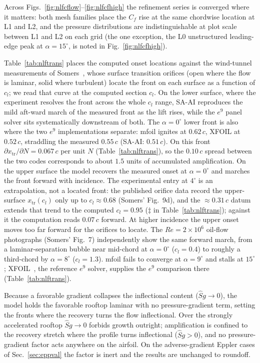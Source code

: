 \documentclass[journal]{new-aiaa}
\begin{document}
Across Figs.~\ref{fig:nlfcflow}--\ref{fig:nlfcfhigh} the refinement series
is converged where it matters: both mesh families place the $C_f$ rise at the
same chordwise location at L1 and L2, and the pressure distributions are
indistinguishable at plot scale between L1 and L2 on each grid (the one
exception, the L0 unstructured leading-edge peak at $\alpha\!=\!15^\circ$, is
noted in Fig.~\ref{fig:nlfcfhigh}).

Table~\ref{tab:nlftrans} places the computed onset locations against the
wind-tunnel
measurements of Somers~\cite{somers_1981}, whose surface transition orifices
(open where the flow is laminar, solid where turbulent) locate the front on each
surface as a function of $c_l$; we read that curve at the computed section
$c_l$. On the lower surface, where the experiment resolves the front across the
whole $c_l$ range, SA-AI reproduces the mild aft-ward march of the measured
front as the lift rises, while the $e^9$ panel solver sits systematically
downstream of both. The $\alpha\!=\!0^\circ$
lower front is also where the two $e^9$ implementations separate:
mfoil ignites at $0.62\,c$, XFOIL at $0.52\,c$, straddling the
measured $0.55\,c$ (SA-AI: $0.51\,c$). On this front
$\partial x_\mathrm{tr}/\partial N\!=\!0.067\,c$ per unit $N$
(Table~\ref{tab:nlftrans}), so the $0.10\,c$ spread between the two
codes corresponds to about $1.5$ units of accumulated amplification. On the upper surface the model
recovers the measured onset at $\alpha\!=\!0^\circ$ and marches
the front forward with incidence. The experimental entry at $4^\circ$ is an
extrapolation, not a located front: the published orifice data record the
upper-surface $x_\mathrm{tr}(c_l)$ only up to $c_l\!\approx\!0.68$ (Somers'
Fig.~9d), and the $\approx\!0.31\,c$ datum extends that trend to the
computed $c_l\!=\!0.95$ ($\ddagger$ in Table~\ref{tab:nlftrans}); against
it the computation reads $0.07\,c$ forward. At higher incidence the upper onset moves too far forward
for the orifices to locate. The $Re\!=\!2\!\times\!10^6$ oil-flow
photographs (Somers' Fig.~7) independently show the same forward march, from a
laminar-separation bubble near mid-chord at $\alpha\!=\!0^\circ$ ($c_l\!=\!0.4$)
to roughly a third-chord by $\alpha\!=\!8^\circ$ ($c_l\!=\!1.3$). mfoil fails to
converge at $\alpha\!=\!9^\circ$ and
stalls at $15^\circ$; XFOIL~\cite{drela_xfoil_1989}, the reference $e^9$ solver,
supplies the $e^9$ comparison there
(Table~\ref{tab:nlftrans}).

Because a favorable gradient collapses the inflectional content
($\hat S g\!\to\!0$), the model holds the favorable rooftop laminar with no
pressure-gradient term, setting the fronts where the recovery turns the flow
inflectional. Over the
strongly accelerated rooftop $\hat S g\!\to\!0$ forbids growth outright; amplification
is confined to the recovery stretch where the profile turns inflectional
($\hat S g\!>\!0$), and no pressure-gradient factor acts anywhere on the airfoil. On the adverse-gradient
Eppler cases of Sec.~\ref{sec:eppval} the factor is inert and the
results are unchanged to roundoff.
\end{document}
